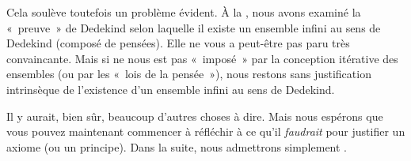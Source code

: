 \documentclass[../../../include/open-logic-section]{subfiles}
\begin{document}
Cela soulève toutefois un problème évident. À la
, nous avons examiné la
«~preuve~» de Dedekind selon laquelle il existe un ensemble infini au
sens de Dedekind (composé de pensées). Elle ne vous a peut-être pas
paru très convaincante. Mais si \stagesinf{} ne nous est pas «~imposé~»
par la conception itérative des ensembles (ou par les «~lois de la
pensée~»), nous restons sans justification intrinsèque de l'existence
d'un ensemble infini au sens de Dedekind.

Il y aurait, bien sûr, beaucoup d'autres choses à dire. Mais nous
espérons que vous pouvez maintenant commencer à réfléchir à ce qu'il
\emph{faudrait} pour justifier un axiome (ou un principe). Dans la
suite, nous admettrons simplement \stagesinf{}.
\end{document}
